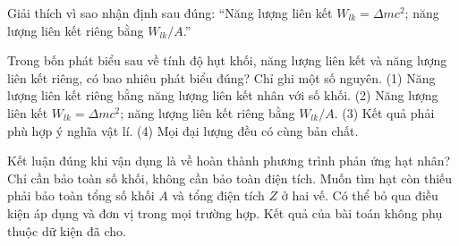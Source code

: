 \begin{bt}
Giải thích vì sao nhận định sau đúng: “Năng lượng liên kết $W_{lk}=\Delta m c^2$; năng lượng liên kết riêng bằng $W_{lk}/A$.”
\end{bt}

\begin{ex}
Trong bốn phát biểu sau về tính độ hụt khối, năng lượng liên kết và năng lượng liên kết riêng, có bao nhiêu phát biểu đúng? Chỉ ghi một số nguyên. (1) Năng lượng liên kết riêng bằng năng lượng liên kết nhân với số khối. (2) Năng lượng liên kết $W_{lk}=\Delta m c^2$; năng lượng liên kết riêng bằng $W_{lk}/A$. (3) Kết quả phải phù hợp ý nghĩa vật lí. (4) Mọi đại lượng đều có cùng bản chất.
\end{ex}

\begin{ex}
Kết luận đúng khi vận dụng là về hoàn thành phương trình phản ứng hạt nhân?
\choice
{Chỉ cần bảo toàn số khối, không cần bảo toàn điện tích.}
{\True Muốn tìm hạt còn thiếu phải bảo toàn tổng số khối $A$ và tổng điện tích $Z$ ở hai vế.}
{Có thể bỏ qua điều kiện áp dụng và đơn vị trong mọi trường hợp.}
{Kết quả của bài toán không phụ thuộc dữ kiện đã cho.}
\end{ex}

